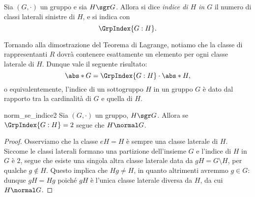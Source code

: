 \begin{definition}
    Sia $(G, \cdot)$ un gruppo e sia $H \sgr G$. Allora si dice \emph{indice di $H$ in $G$} il numero di classi laterali sinistre di $H$, e si indica con \begin{equation}
        \GrpIndex{G:H}.
    \end{equation}
\end{definition}

Tornando alla dimostrazione del Teorema di Lagrange, notiamo che la classe di rappresentanti $R$ dovrà contenere esattamente un elemento per ogni classe laterale di $H$. Dunque vale il seguente risultato:
\begin{equation}
    \label{eq:index}
    \abs*{G} = \GrpIndex{G:H} \cdot \abs*{H}, 
\end{equation} o equivalentemente, l'indice di un sottogruppo $H$ in un gruppo $G$ è dato dal rapporto tra la cardinalità di $G$ e quella di $H$.

\begin{proposition}{norm_se_indice2}
    Sia $(G, \cdot)$ un gruppo, $H \sgr G$. Allora se $\GrpIndex{G:H} = 2$ segue che $H \normal G$.
\end{proposition}
\begin{proof}
    Osserviamo che la classe $eH = H$ è sempre una classe laterale di $H$.
    Siccome le classi laterali formano una partizione dell'insieme $G$ e l'indice di $H$ in $G$ è $2$, segue che esiste una singola altra classe laterale
    data da $gH = G \setminus H$, per qualche $g \notin H$.
    Questo implica che $Hg \neq H$, in quanto altrimenti avremmo $g \in G$: dunque $gH = Hg$ poiché $gH$ è l'unica classe laterale diversa da $H$, da cui $H \normal G$.
\end{proof}

